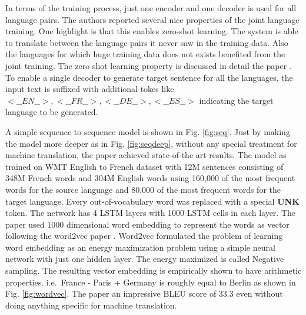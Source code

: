 \documentclass[a4paper]{article}
\begin{document}
In terms of the training process, just one encoder  and one decoder  is used for
all  language  pairs. The authors  reported several nice properties of the joint
language training. One highlight  is that  this enables zero-shot learning.  The
system is able  to translate between the  language  pairs it never  saw  in  the
training data. Also the languages for which huge training data does not exists benefited
from the joint training. The zero shot learning property  is discussed in detail
the  paper  \cite{johnson2016google}.  To  enable  a single decoder to  generate
target  sentence for  all  the  languages,  the  input  text  is  suffixed  with
additional  tokes  like $<\_\_EN\_\_>, <\_\_FR\_\_>, <\_\_DE\_\_>, <\_\_ES\_\_>$
indicating the target language to be generated.

A simple sequence  to sequence  model is shown in  Fig. \ref{fig:seq}.  Just  by
making the model  more deeper as in Fig. \ref{fig:seqdeep}, without any  special
treatment for machine translation, the paper achieved state-of-the art  results.
The  model as trained  on  WMT  English  to  French dataset with  12M  sentences
consisting of 348M French words and 304M English words using 160,000 of the most
frequent words for the source language and 80,000 of the most frequent words for
the target language. Every  out-of-vocabulary word was replaced with  a  special
\textbf{UNK} token.  The network has 4  LSTM layers with 1000 LSTM cells in each
layer. The paper used 1000 dimensional  word embedding to represent the words as
vector  following  the word2vec  paper  \cite{mikolov2013distributed}.  Word2vec
formulated  the  problem  of learning word embedding as an  energy  maximization
problem  using a  simple neural network with just  one  hidden layer. The energy
maximized  is  called  Negative  sampling.  The resulting  vector  embedding  is
empirically shown to  have  arithmetic properties.  i.e. $\,$France  -  Paris  +
Germany is roughly equal to Berlin as shown in Fig. \ref{fig:wordvec}. The paper
an impressive  BLEU  score  of  33.3 even without  doing  anything  specific for
machine translation.
\end{document}
